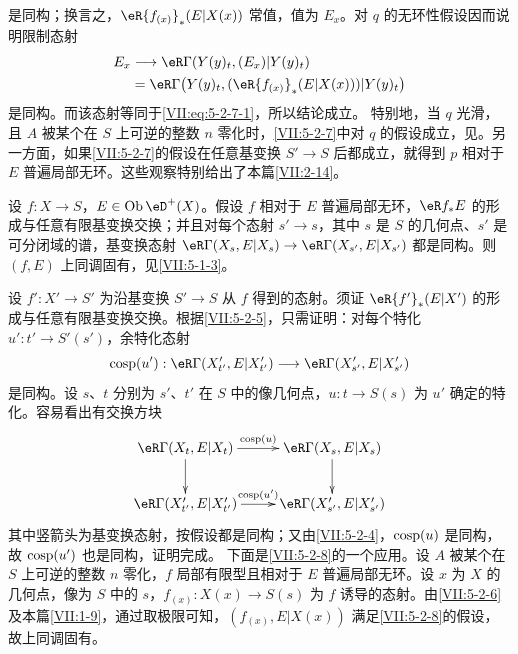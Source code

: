 是同构；换言之，$\eR{f_{(x)}}_\ast(E|X(x))$ 常值，值为 $E_x$。对 $q$ 的无环性假设因而说明限制态射
\begin{align*}
 E_x&\longrightarrow\eR\Gamma(Y(y)_t,(E_x)|Y(y)_t)\\
 &=\eR\Gamma\bigl(Y(y)_t,(\eR{f_{(x)}}_\ast(E|X(x)))|Y(y)_t\bigr)
\end{align*}
是同构。而该态射等同于\eqref{VII:eq:5-2-7-1}，所以结论成立。
特别地，当 $q$ 光滑，且 $A$ 被某个在 $S$ 上可逆的整数 $n$ 零化时，\ref{VII:5-2-7}中对 $q$ 的假设成立，见\cite[XV]{sga4}。另一方面，如果\ref{VII:5-2-7}的假设在任意基变换 $S'\to S$ 后都成立，就得到 $p$ 相对于 $E$ 普遍局部无环。这些观察特别给出了本篇\ref{VII:2-14}。
\begin{corollary_}\label{VII:5-2-8}
设 $f:X\to S$，$E\in\ob\eD^+(X)$。假设 $f$ 相对于 $E$ 普遍局部无环，$\eR f_\ast E$ 的形成与任意有限基变换交换；并且对每个态射 $s'\to s$，其中 $s$ 是 $S$ 的几何点、$s'$ 是可分闭域的谱，基变换态射
$\eR\Gamma(X_s,E|X_s)\to\eR\Gamma(X_{s'},E|X_{s'})$ 都是同构。则 $(f,E)$ 上同调固有，见\ref{VII:5-1-3}。
\end{corollary_}
设 $f':X'\to S'$ 为沿基变换 $S'\to S$ 从 $f$ 得到的态射。须证 $\eR{f'}_\ast(E|X')$ 的形成与任意有限基变换交换。根据\ref{VII:5-2-5}，只需证明：对每个特化 $u':t'\to S'(s')$，余特化态射
\[
 \cosp(u'):\eR\Gamma(X'_{t'},E|X'_{t'})\longrightarrow\eR\Gamma(X'_{s'},E|X'_{s'})
\]
是同构。设 $s$、$t$ 分别为 $s'$、$t'$ 在 $S$ 中的像几何点，$u:t\to S(s)$ 为 $u'$ 确定的特化。容易看出有交换方块
\[\xymatrix{
 \eR\Gamma(X_t,E|X_t)\ar[r]^-{\cosp(u)}\ar[d]&\eR\Gamma(X_s,E|X_s)\ar[d]\\
 \eR\Gamma(X'_{t'},E|X'_{t'})\ar[r]^-{\cosp(u')}&\eR\Gamma(X'_{s'},E|X'_{s'})
}\]
其中竖箭头为基变换态射，按假设都是同构；又由\ref{VII:5-2-4}，$\operatorname{cosp}(u)$ 是同构，故 $\operatorname{cosp}(u')$ 也是同构，证明完成。
下面是\ref{VII:5-2-8}的一个应用。设 $A$ 被某个在 $S$ 上可逆的整数 $n$ 零化，$f$ 局部有限型且相对于 $E$ 普遍局部无环。设 $x$ 为 $X$ 的几何点，像为 $S$ 中的 $s$，$f_{(x)}:X(x)\to S(s)$ 为 $f$ 诱导的态射。由\ref{VII:5-2-6}及本篇\ref{VII:1-9}，通过取极限可知，$(f_{(x)},E|X(x))$ 满足\ref{VII:5-2-8}的假设，故上同调固有。
